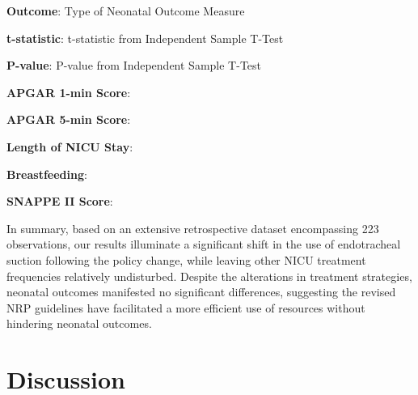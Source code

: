 \documentclass[11pt]{article}
\begin{document}
\begin{table}[h]
\caption{T-test results for the difference in neonatal outcomes before and after policy change}
\label{table:outcome_change}
\begin{threeparttable}
\renewcommand{\TPTminimum}{\linewidth}
\begin{tablenotes}
\footnotesize
\item \textbf{Outcome}: Type of Neonatal Outcome Measure
\item \textbf{t-statistic}: t-statistic from Independent Sample T-Test
\item \textbf{P-value}: P-value from Independent Sample T-Test
\item \textbf{APGAR 1-min Score}: 
\item \textbf{APGAR 5-min Score}: 
\item \textbf{Length of NICU Stay}: 
\item \textbf{Breastfeeding}: 
\item \textbf{SNAPPE II Score}: 
\end{tablenotes}
\end{threeparttable}
\end{table}


In summary, based on an extensive retrospective dataset encompassing 223 observations, our results illuminate a significant shift in the use of endotracheal suction following the policy change, while leaving other NICU treatment frequencies relatively undisturbed. Despite the alterations in treatment strategies, neonatal outcomes manifested no significant differences, suggesting the revised NRP guidelines have facilitated a more efficient use of resources without hindering neonatal outcomes.

\section*{Discussion}
\end{document}

